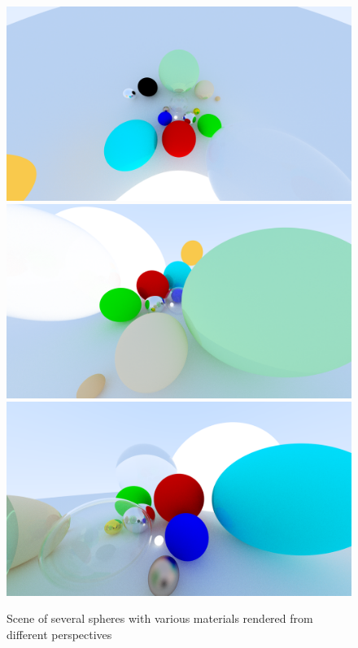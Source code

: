 \documentclass[]{article}
\begin{document}
			\begin{figure}[h]
				\centering
				\includegraphics[width=0.30\linewidth]{image9}
				\includegraphics[width=0.30\linewidth]{image9-2}
				\includegraphics[width=0.30\linewidth]{image9-3}
				\caption{Scene of several spheres with various materials rendered from different perspectives}
				\label{fig:image9}
			\end{figure}			
			
\end{document}
